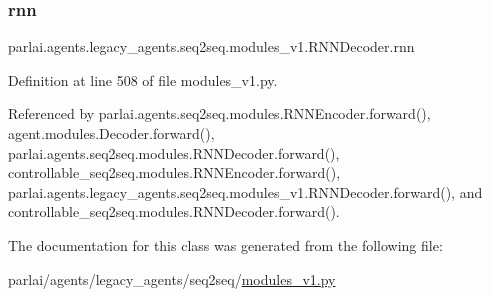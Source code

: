 \subsubsection{\texorpdfstring{rnn}{rnn}}
{\footnotesize\ttfamily parlai.\+agents.\+legacy\+\_\+agents.\+seq2seq.\+modules\+\_\+v1.\+R\+N\+N\+Decoder.\+rnn}



Definition at line 508 of file modules\+\_\+v1.\+py.



Referenced by parlai.\+agents.\+seq2seq.\+modules.\+R\+N\+N\+Encoder.\+forward(), agent.\+modules.\+Decoder.\+forward(), parlai.\+agents.\+seq2seq.\+modules.\+R\+N\+N\+Decoder.\+forward(), controllable\+\_\+seq2seq.\+modules.\+R\+N\+N\+Encoder.\+forward(), parlai.\+agents.\+legacy\+\_\+agents.\+seq2seq.\+modules\+\_\+v1.\+R\+N\+N\+Decoder.\+forward(), and controllable\+\_\+seq2seq.\+modules.\+R\+N\+N\+Decoder.\+forward().



The documentation for this class was generated from the following file\+:\begin{DoxyCompactItemize}
\item 
parlai/agents/legacy\+\_\+agents/seq2seq/\hyperlink{modules__v1_8py}{modules\+\_\+v1.\+py}\end{DoxyCompactItemize}
